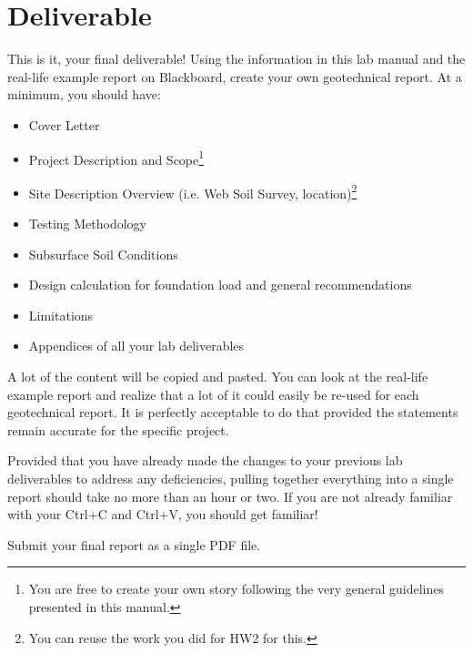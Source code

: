 \documentclass[12pt]{article}
\begin{document}
\newpage
\section{Deliverable}
This is it, your final deliverable! Using the information in this lab manual and the real-life example report on Blackboard, create your own geotechnical report. At a minimum, you should have:

\begin{itemize}
    \item Cover Letter
    \item Project Description and Scope\footnote{You are free to create your own story following the very general guidelines presented in this manual.}
    \item Site Description Overview (i.e. Web Soil Survey, location)\footnote{You can reuse the work you did for HW2 for this.}
    \item Testing Methodology
    \item Subsurface Soil Conditions
    \item Design calculation for foundation load and general recommendations
    \item Limitations
    \item Appendices of all your lab deliverables
\end{itemize}

A lot of the content will be copied and pasted. You can look at the real-life example report and realize that a lot of it could easily be re-used for each geotechnical report. It is perfectly acceptable to do that provided the statements remain accurate for the specific project.

Provided that you have already made the changes to your previous lab deliverables to address any deficiencies, pulling together everything into a single report should take no more than an hour or two. If you are not already familiar with your Ctrl+C and Ctrl+V, you should get familiar!

Submit your final report as a single PDF file.



%
%

\end{document}
